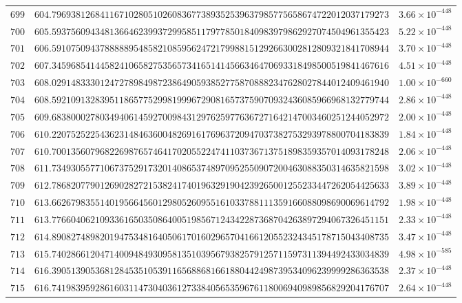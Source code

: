 \documentclass[12pt,reqno]{amsart}
\theoremstyle{remark}
\begin{document}
\begin{longtable}{clc}
$699$ & $604.7969381268411671028051026083677389352539637985775658674722012037179273$ & $3.66\times 10^{-448}$ \\
$700$ & $605.5937560943481366462399372995851179778501840983979862927074504961355423$ & $5.22\times 10^{-448}$ \\
$701$ & $606.5910750943788888954858210859562472179988151292663002812809321841708944$ & $3.70\times 10^{-448}$ \\
$702$ & $607.3459685414458241065827535657341651414566346470693318498500519841467616$ & $4.51\times 10^{-448}$ \\
$703$ & $608.0291483330124727898498723864905938527758708882347628027844012409461940$ & $1.00\times 10^{-660}$ \\
$704$ & $608.5921091328395118657752998199967290816573759070932436085966968132779744$ & $2.86\times 10^{-448}$ \\
$705$ & $609.6838000278034940614592700984312976259776367271642147003460251244052972$ & $2.00\times 10^{-448}$ \\
$706$ & $610.2207525225436231484636004826916176963720947037382753293978800704183839$ & $1.84\times 10^{-448}$ \\
$707$ & $610.7001356079682269876574641702055224741103736713751898359357014093178248$ & $2.06\times 10^{-448}$ \\
$708$ & $611.7349305577106737529173201408653748970952550907200463088350314635821598$ & $3.02\times 10^{-448}$ \\
$709$ & $612.7868207790126902827215382417401963291904239265001255233447262054425633$ & $3.89\times 10^{-448}$ \\
$710$ & $613.6626798355140195664560129805260955161033788111359166088098690069614792$ & $1.98\times 10^{-448}$ \\
$711$ & $613.7766040621093361650350864005198567124342287368704263897294067326451151$ & $2.33\times 10^{-448}$ \\
$712$ & $614.8908274898201947534816405061701602965704166120552324345178715043408735$ & $3.47\times 10^{-448}$ \\
$713$ & $615.7402866120471400948493095813510395679382579125711597311394492433034839$ & $4.98\times 10^{-585}$ \\
$714$ & $616.3905139053681284535105391165688681661880442498739534096239999286363538$ & $2.37\times 10^{-448}$ \\
$715$ & $616.7419839592861603114730403612733840565359676118006940989856829204176707$ & $2.64\times 10^{-448}$ \\

\end{longtable}
\end{document}
